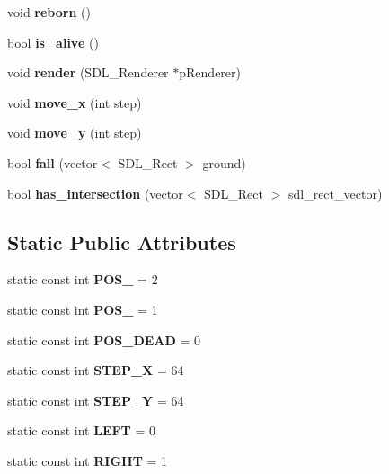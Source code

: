 \begin{DoxyCompactItemize}
void {\bfseries reborn} ()
\item 
\mbox{\label{classPlayer_ab1f2bf51fdf1d8930efa76223b61281e}} 
bool {\bfseries is\+\_\+alive} ()
\item 
\mbox{\label{classPlayer_a04cd67ad282a8354b059cb66de09d4e3}} 
void {\bfseries render} (S\+D\+L\+\_\+\+Renderer $\ast$p\+Renderer)
\item 
\mbox{\label{classPlayer_a90aa8c53cd4fb7c8519200130c29f10f}} 
void {\bfseries move\+\_\+x} (int step)
\item 
\mbox{\label{classPlayer_a075a343d57a62dde4ac39aa4ac7b5e93}} 
void {\bfseries move\+\_\+y} (int step)
\item 
\mbox{\label{classPlayer_ac3ccbc371e7d902970215d066278cfc6}} 
bool {\bfseries fall} (vector$<$ S\+D\+L\+\_\+\+Rect $>$ ground)
\item 
\mbox{\label{classPlayer_a7831c86336c460c291c6cbe8c500b7ad}} 
bool {\bfseries has\+\_\+intersection} (vector$<$ S\+D\+L\+\_\+\+Rect $>$ sdl\+\_\+rect\+\_\+vector)
\end{DoxyCompactItemize}
\subsection*{Static Public Attributes}
\begin{DoxyCompactItemize}
\item 
\mbox{\label{classPlayer_a4731a7e2f587c90e9f3621c90a5563dd}} 
static const int {\bfseries P\+O\+S\+\_} = 2
\item 
\mbox{\label{classPlayer_a934460fa1f4d73996e766f4c6e65f2a3}} 
static const int {\bfseries P\+O\+S\+\_} = 1
\item 
\mbox{\label{classPlayer_a0c0f5a2184f7bd931d3a9eb00ee1035f}} 
static const int {\bfseries P\+O\+S\+\_\+\+D\+E\+AD} = 0
\item 
\mbox{\label{classPlayer_a0fbf4dd67da429f6bc470e11028dcc21}} 
static const int {\bfseries S\+T\+E\+P\+\_\+X} = 64
\item 
\mbox{\label{classPlayer_acf3757760dc2df9f8f4946b1e4d7c9d3}} 
static const int {\bfseries S\+T\+E\+P\+\_\+Y} = 64
\item 
\mbox{\label{classPlayer_aece6c46027c4acc1beb0a497a3e33f3a}} 
static const int {\bfseries L\+E\+FT} = 0
\item 
\mbox{\label{classPlayer_ade313fafeead1bcc2c07a712e8dfc18d}} 
static const int {\bfseries R\+I\+G\+HT} = 1
\end{DoxyCompactItemize}


